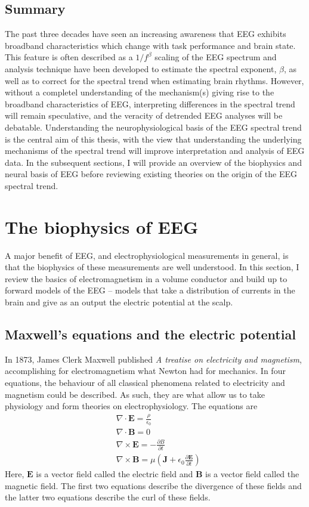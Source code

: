 \subsection{Summary}
The past three decades have seen an increasing awareness that EEG exhibits broadband characteristics which change with task performance and brain state. This feature is often described as a $1/f^\beta$ scaling of the EEG spectrum and analysis technique have been developed to estimate the spectral exponent, $\beta$, as well as to correct for the spectral trend when estimating brain rhythms. However, without a completel understanding of the mechanism(s) giving rise to the broadband characteristics of EEG, interpreting differences in the spectral trend will remain speculative, and the veracity of detrended EEG analyses will be debatable. Understanding the neurophysiological basis of the EEG spectral trend is the central aim of this thesis, with the view that understanding the underlying mechanisms of the spectral trend will improve interpretation and analysis of EEG data. In the subsequent sections, I will provide an overview of the biophysics and neural basis of EEG before reviewing existing theories on the origin of the EEG spectral trend.

\section{The biophysics of EEG} \label{sec:EM_theory}

A major benefit of EEG, and electrophysiological measurements in general, is that the biophysics of these measurements are well understood. In this section, I review the basics of electromagnetism in a volume conductor and build up to forward models of the EEG -- models that take a distribution of currents in the brain and give as an output the electric potential at the scalp.

\subsection{Maxwell's equations and the electric potential}
In 1873, James Clerk Maxwell published \textit{A treatise on electricity and magnetism}, accomplishing for electromagnetism what Newton had for mechanics. In four equations, the behaviour of all classical phenomena related to electricity and magnetism could be described. As such, they are what allow us to take physiology and form theories on electrophysiology. The equations are
\begin{align*}
    & \nabla \cdot \bm{E} = \frac{\rho}{\epsilon_0} \\
    & \nabla \cdot \bm{B} = 0 \\
    & \nabla \times \bm{E} = - \frac{\partial {B}}{\partial t} \\
    & \nabla \times \bm{B} = \mu \left( \bm{J} + \epsilon_0 \frac{\partial \bm{E}}{\partial t} \right)
\end{align*}
Here, $\bm{E}$ is a vector field called the electric field and $\bm{B}$ is a vector field called the magnetic field. The first two equations describe the divergence of these fields and the latter two equations describe the curl of these fields. 

